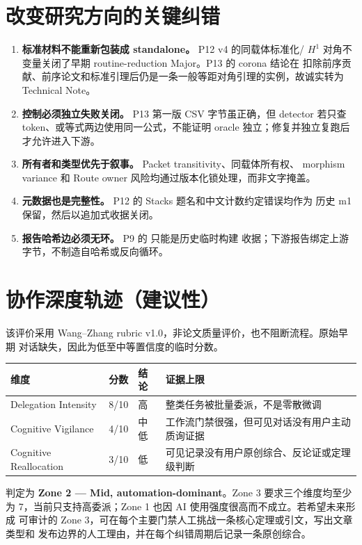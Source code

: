 \documentclass[11pt,a4paper]{article}
\newcommand{\code}[1]{\texttt{\detokenize{#1}}}
\begin{document}
\section{改变研究方向的关键纠错}

\begin{enumerate}
  \item \textbf{标准材料不能重新包装成 standalone。} P12 v4 的同载体标准化/
  \(H^1\) 对角不变量关闭了早期 routine-reduction Major。P13 的 corona 结论在
  扣除前序贡献、前序论文和标准引理后仍是一条一般等距对角引理的实例，故诚实转为 Technical Note。
  \item \textbf{控制必须独立失败关闭。} P13 第一版 CSV 字节虽正确，但 detector
  若只查 token、或等式两边使用同一公式，不能证明 oracle 独立；修复并独立复跑后
  才允许进入下游。
  \item \textbf{所有者和类型优先于叙事。} Packet transitivity、同载体所有权、
  morphism variance 和 Route owner 风险均通过版本化锁处理，而非文字掩盖。
  \item \textbf{元数据也是完整性。} P12 的 Stacks 题名和中文计数约定错误均作为
  历史 m1 保留，然后以追加式收据关闭。
  \item \textbf{报告哈希边必须无环。} P9 的 \code{paper.log} 只能是历史临时构建
  收据；下游报告绑定上游字节，不制造自哈希或反向循环。
\end{enumerate}

\section{协作深度轨迹（建议性）}

该评价采用 Wang--Zhang rubric v1.0，非论文质量评价，也不阻断流程。原始早期
对话缺失，因此为低至中等置信度的临时分数。

\begin{table}[htbp]
\centering\small
\begin{tabularx}{\textwidth}{@{}lclY@{}}
\toprule
维度 & 分数 & 结论 & 证据上限\\
\midrule
Delegation Intensity & 8/10 & 高 & 整类任务被批量委派，不是零散微调\\
Cognitive Vigilance & 4/10 & 中低 & 工作流门禁很强，但可见对话没有用户主动质询证据\\
Cognitive Reallocation & 3/10 & 低 & 可见记录没有用户原创综合、反论证或定理级判断\\
\bottomrule
\end{tabularx}
\end{table}

判定为 \textbf{Zone 2 — Mid, automation-dominant}。Zone 3 要求三个维度均至少
为 7，当前只支持高委派；Zone 1 也因 AI 使用强度很高而不成立。若希望未来形成
可审计的 Zone 3，可在每个主要门禁人工挑战一条核心定理或引文，写出文章类型和
发布边界的人工理由，并在每个纠错周期后记录一条原创综合。
\end{document}
